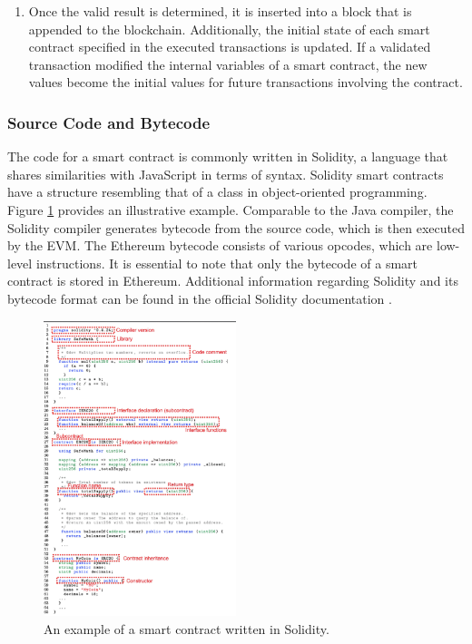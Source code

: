 \begin{enumerate}
    \item Once the valid result is determined, it is inserted into a block that is appended to the blockchain. Additionally, the initial state of each smart contract specified in the executed transactions is updated. If a validated transaction modified the internal variables of a smart contract, the new values become the initial values for future transactions involving the contract.
\end{enumerate}

\subsubsection{Source Code and Bytecode}
    
    The code for a smart contract is commonly written in Solidity, a language that shares similarities with JavaScript in terms of syntax. Solidity smart contracts have a structure resembling that of a class in object-oriented programming. Figure \ref{fig:An example of a smart contract written in Solidity} provides an illustrative example. Comparable to the Java compiler, the Solidity compiler generates bytecode from the source code, which is then executed by the \ac{EVM}. The Ethereum bytecode consists of various opcodes, which are low-level instructions. It is essential to note that only the bytecode of a smart contract is stored in Ethereum. Additional information regarding Solidity and its bytecode format can be found in the official Solidity documentation \cite{solidity_doc}.
    
 \begin{figure}[H]
 \centering
  \includegraphics[height=0.7\textwidth  ,width=0.5\textwidth]{smart contract code.png}
  \caption{An example of a smart contract written in Solidity.}
  \label{fig:An example of a smart contract written in Solidity}
\end{figure}

